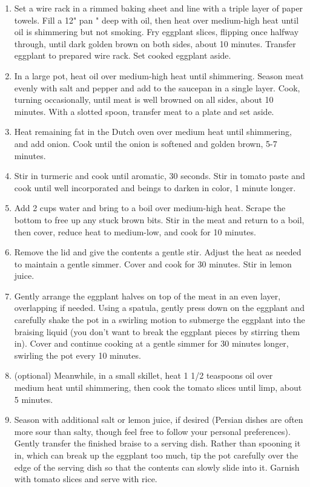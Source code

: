 \begin{enumerate}
    \item Set a wire rack in a rimmed baking sheet and line with a triple layer of paper towels. Fill a 12" pan " deep with oil, then heat over medium-high heat until oil is shimmering but not smoking. Fry eggplant slices, flipping once halfway through, until dark golden brown on both sides, about 10 minutes. Transfer eggplant to prepared wire rack. Set cooked eggplant aside.
    \item In a large pot, heat oil over medium-high heat until shimmering. Season meat evenly with salt and pepper and add to the saucepan in a single layer. Cook, turning occasionally, until meat is well browned on all sides, about 10 minutes. With a slotted spoon, transfer meat to a plate and set aside.
    \item Heat remaining fat in the Dutch oven over medium heat until shimmering, and add onion. Cook until the onion is softened and golden brown, 5-7 minutes.
    \item Stir in turmeric and cook until aromatic, 30 seconds. Stir in tomato paste and cook until well incorporated and beings to darken in color, 1 minute longer.
    \item Add 2 cups water and bring to a boil over medium-high heat. Scrape the bottom to free up any stuck brown bits. Stir in the meat and return to a boil, then cover, reduce heat to medium-low, and cook for 10 minutes.
    \item Remove the lid and give the contents a gentle stir. Adjust the heat as needed to maintain a gentle simmer. Cover and cook for 30 minutes. Stir in lemon juice.
    \item Gently arrange the eggplant halves on top of the meat in an even layer, overlapping if needed. Using a spatula, gently press down on the eggplant and carefully shake the pot in a swirling motion to submerge the eggplant into the braising liquid (you don't want to break the eggplant pieces by stirring them in). Cover and continue cooking at a gentle simmer for 30 minutes longer, swirling the pot every 10 minutes.
    \item (optional) Meanwhile, in a small skillet, heat 1 1/2 teaspoons oil over medium heat until shimmering, then cook the tomato slices until limp, about 5 minutes.
    \item Season with additional salt or lemon juice, if desired (Persian dishes are often more sour than salty, though feel free to follow your personal preferences). Gently transfer the finished braise to a serving dish. Rather than spooning it in, which can break up the eggplant too much, tip the pot carefully over the edge of the serving dish so that the contents can slowly slide into it. Garnish with tomato slices and serve with rice.
\end{enumerate}